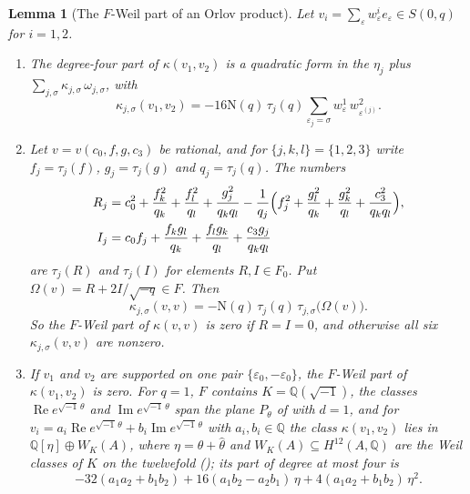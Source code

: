 \documentclass[11pt,reqno]{amsart}
\theoremstyle{plain}
\newtheorem{lemma}[theorem]{Lemma}
\theoremstyle{definition}
\theoremstyle{remark}
\newcommand{\QQ}{\mathbb{Q}}
\newcommand{\Nm}{\mathrm{N}}             %
\begin{document}
\begin{lemma}[The $F$-Weil part of an Orlov product]\label{lem:sexticweil}
Let $v_{i}=\sum_{\varepsilon}w^{i}_{\varepsilon}e_{\varepsilon}\in S(0,q)$ for
$i=1,2$.
\begin{enumerate}[label=\textup{(\roman*)},leftmargin=2.6em,itemsep=2pt]
\item The degree-four part of $\kappa(v_{1},v_{2})$ is a quadratic form in the
  $\eta_{j}$ plus $\sum_{j,\sigma}\kappa_{j,\sigma}\,\omega_{j,\sigma}$, with
  \[
    \kappa_{j,\sigma}(v_{1},v_{2})=-16\Nm(q)\,\tau_{j}(q)
    \sum_{\varepsilon_{j}=\sigma}w^{1}_{\varepsilon}\,w^{2}_{\varepsilon^{(j)}}.
  \]
\item Let $v=v(c_{0},f,g,c_{3})$ be rational, and for $\{j,k,l\}=\{1,2,3\}$
  write $f_{j}=\tau_{j}(f)$, $g_{j}=\tau_{j}(g)$ and $q_{j}=\tau_{j}(q)$. The
  numbers
  \begin{align*}
    R_{j}&=c_{0}^{2}+\frac{f_{k}^{2}}{q_{k}}+\frac{f_{l}^{2}}{q_{l}}
      +\frac{g_{j}^{2}}{q_{k}q_{l}}-\frac{1}{q_{j}}\Bigl(f_{j}^{2}
      +\frac{g_{l}^{2}}{q_{k}}+\frac{g_{k}^{2}}{q_{l}}
      +\frac{c_{3}^{2}}{q_{k}q_{l}}\Bigr),\\
    I_{j}&=c_{0}f_{j}+\frac{f_{k}g_{l}}{q_{k}}+\frac{f_{l}g_{k}}{q_{l}}
      +\frac{c_{3}g_{j}}{q_{k}q_{l}}
  \end{align*}
  are $\tau_{j}(R)$ and $\tau_{j}(I)$ for elements $R,I\in F_{0}$. Put
  $\Omega(v)=R+2I/\sqrt{-q}\in F$. Then
  \[
    \kappa_{j,\sigma}(v,v)=-\Nm(q)\,\tau_{j}(q)\,\tau_{j,\sigma}\bigl(\Omega(v)\bigr).
  \]
  So the $F$-Weil part of $\kappa(v,v)$ is zero if $R=I=0$, and otherwise
  all six $\kappa_{j,\sigma}(v,v)$ are nonzero.
\item If $v_{1}$ and $v_{2}$ are supported on one pair
  $\{\varepsilon_{0},-\varepsilon_{0}\}$, the $F$-Weil part of
  $\kappa(v_{1},v_{2})$ is zero. For $q=1$, $F$ contains
  $K=\QQ(\sqrt{-1})$, the classes $\operatorname{Re}e^{\sqrt{-1}\,\theta}$ and
  $\operatorname{Im}e^{\sqrt{-1}\,\theta}$ span the plane $P_{\theta}$ of
  \cite[Definition~14.4]{paperI} with $d=1$, and for
  $v_{i}=a_{i}\operatorname{Re}e^{\sqrt{-1}\,\theta}
  +b_{i}\operatorname{Im}e^{\sqrt{-1}\,\theta}$ with $a_{i},b_{i}\in\QQ$ the
  class $\kappa(v_{1},v_{2})$ lies in $\QQ[\eta]\oplus W_{K}(A)$, where
  $\eta=\theta+\widehat\theta$ and $W_{K}(A)\subseteq H^{12}(A,\QQ)$ are the
  Weil classes of $K$ on the twelvefold (\cite[Proposition~17.10]{paperI}); its part of
  degree at most four is
  \[
    -32(a_{1}a_{2}+b_{1}b_{2})+16(a_{1}b_{2}-a_{2}b_{1})\,\eta
    +4(a_{1}a_{2}+b_{1}b_{2})\,\eta^{2}.
  \]
\end{enumerate}
\end{lemma}
\end{document}
